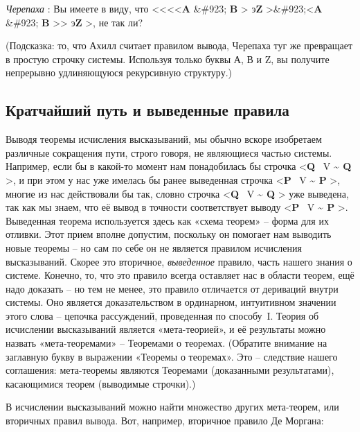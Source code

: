 \documentclass[../main.tex]{subfiles}
\begin{document}
\emph{Черепаха} : Вы имеете в виду, что \textless\textless\textless\textless{}\textbf{A} \&\#923; \textbf{B} \textgreater{} э\textbf{Z} \textgreater\&\#923;\textless{}\textbf{A} \&\#923; \textbf{B} \textgreater\textgreater{} э\textbf{Z} \textgreater, не так ли?

(Подсказка: то, что Ахилл считает правилом вывода, Черепаха туг же превращает в простую строчку системы. Используя только буквы А, В и Z, вы получите непрерывно удлиняющуюся рекурсивную структуру.)


\subsection{Кратчайший путь и выведенные правила}

Выводя теоремы исчисления высказываний, мы обычно вскоре изобретаем различные сокращения пути, строго говоря, не являющиеся частью системы. Например, если бы в какой-то момент нам понадобилась бы строчка \textless{}\textbf{Q} ~V \textbf{\textasciitilde{} Q} \textgreater, и при этом у нас уже имелась бы ранее выведенная строчка \textless{}\textbf{P} ~V \textbf{\textasciitilde{} P} \textgreater, многие из нас действовали бы так, словно строчка \textless{}\textbf{Q} ~V \textbf{\textasciitilde{} Q} \textgreater{} уже выведена, так как мы знаем, что её вывод в точности соответствует выводу \textless{}\textbf{P} ~V \textbf{\textasciitilde{} P} \textgreater. Выведенная теорема используется здесь как «схема теорем» \--- форма для их отливки. Этот прием вполне допустим, поскольку он помогает нам выводить новые теоремы \--- но сам по себе он не является правилом исчисления высказываний. Скорее это вторичное, \emph{выведенное} правило, часть нашего знания о системе. Конечно, то, что это правило всегда оставляет нас в области теорем, ещё надо доказать \--- но тем не менее, это правило отличается от дериваций внутри системы. Оно является доказательством в ординарном, интуитивном значении этого слова \--- цепочка рассуждений, проведенная по способу~I\@. Теория об исчислении высказываний является «мета-теорией», и её результаты можно назвать «мета-теоремами» \--- Теоремами о теоремах. (Обратите внимание на заглавную букву в выражении «Теоремы о теоремах». Это \--- следствие нашего соглашения: мета-теоремы являются Теоремами (доказанными результатами), касающимися теорем (выводимые строчки).)

В исчислении высказываний можно найти множество других мета-теорем, или вторичных правил вывода. Вот, например, вторичное правило Де Моргана:
\end{document}
